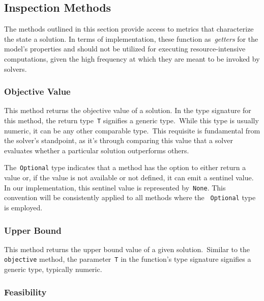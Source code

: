 \subsection{Inspection Methods}

The methods outlined in this section provide access to metrics that characterize
the state a solution. In terms of implementation, these function
as~\emph{getters} for the model's properties and should not be utilized for
executing resource-intensive computations, given the high frequency at which
they are meant to be invoked by solvers.

\subsubsection*{Objective Value}

\begin{center}
\end{center}

This method returns the objective value of a solution. In the type
signature for this method, the return type~\texttt{T} signifies a
generic type.~While this type is usually numeric, it can be any other
comparable type.~This requisite is fundamental from the solver's standpoint, as
it's through comparing this value that a solver evaluates whether a particular
solution outperforms others.

The~\texttt{Optional} type indicates that a method has the option to either return
a value or, if the value is not available or not defined, it can emit a sentinel
value. In our implementation, this sentinel value is represented by~\texttt{None}.
This convention will be consistently applied to all methods where the
~\texttt{Optional} type is employed.

\subsubsection*{Upper Bound}

\begin{center}
\end{center}

This method returns the upper bound value of a given solution.~Similar to the
\texttt{objective} method, the parameter~\texttt{T} in the function's type
signature signifies a generic type, typically numeric.

\subsubsection*{Feasibility}

